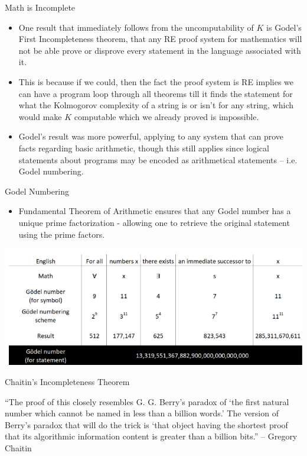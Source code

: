 \documentclass[aspectratio=169]{beamer}
\begin{document}
\begin{frame}{Math is Incomplete}
\begin{itemize}
    \item One result that immediately follows from the uncomputability of $K$ is Godel's First Incompleteness theorem, that any RE proof system for mathematics will not be able prove or disprove every statement in the language associated with it. 
    \item This is because if we could, then the fact the proof system is RE implies we can have a program loop through all theorems till it finds the statement for what the Kolmogorov complexity of a string is or isn't for any string, which would make $K$ computable which we already proved is impossible. \pause
    \item Godel's result was more powerful, applying to any system that can prove facts regarding basic arithmetic, though this still applies since logical statements about programs may be encoded as arithmetical statements -- i.e. Godel numbering.
  \end{itemize}
  
\end{frame}

\begin{frame}{Godel Numbering}
\begin{itemize}
    \item Fundamental Theorem of Arithmetic ensures that any Godel number has a unique prime factorization - allowing one to retrieve the original statement using the prime factors. 
  \end{itemize}
  \begin{center}
    \includegraphics[width=1\textwidth]{ex_encode.PNG}
  \end{center}
  
\end{frame}

\begin{frame}{Chaitin's Incompleteness Theorem}
  
``The proof of this closely resembles G. G. Berry’s paradox of ‘the first natural number which cannot be named in less than a billion words.’ The version of Berry’s paradox that will do the trick is ‘that object having the shortest proof that its algorithmic information content is greater than a billion bits.'' -- Gregory Chaitin

\end{frame}
\end{document}
